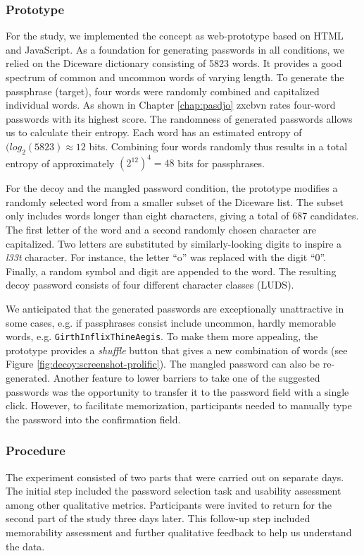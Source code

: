 \subsubsection{Prototype}
For the study, we implemented the concept as web-prototype based on HTML and JavaScript. As a foundation for  generating passwords in all conditions, we relied on the Diceware dictionary consisting of 5823 words. It provides a good spectrum of common and uncommon words of varying length. To generate the passphrase (target), four words were randomly combined and capitalized individual words. As shown in Chapter \ref{chap:pasdjo} zxcbvn rates four-word passwords with its highest score. The randomness of generated passwords allows us to calculate their entropy. Each word has an estimated entropy of $(log_2(5823) \approx 12$ bits. Combining four words randomly thus results in a total entropy of approximately $ (2^{12})^4 = 48$ bits for passphrases.

For the decoy and the mangled password condition, the prototype modifies a randomly selected word from a smaller subset of the Diceware list. The subset only includes words longer than eight characters, giving a total of 687 candidates. The first letter of the word and a second randomly chosen character are capitalized. Two letters are substituted by similarly-looking digits to inspire a \textit{l33t} character. For instance, the letter ``o'' was replaced with the digit ``0''. Finally, a random symbol and digit are appended to the word. The resulting decoy password consists of four different character classes (LUDS). 

We anticipated that the generated passwords are exceptionally unattractive in some cases, e.g. if passphrases consist include uncommon, hardly memorable words, e.g. \texttt{GirthInflixThineAegis}. To make them more appealing, the prototype provides a \textit{shuffle} button that gives a new combination of words (see Figure \ref{fig:decoy:screenshot-prolific}). The mangled password can also be re-generated. Another feature to lower barriers to take one of the suggested passwords was the opportunity to transfer it to the password field with a single click. However, to facilitate memorization, participants needed to manually type the password into the confirmation field. 

\subsubsection{Procedure}
The experiment consisted of two parts that were carried out on separate days. The initial step included the password selection task and usability assessment among other qualitative metrics. Participants were invited to return for the second part of the study three days later. This follow-up step included memorability assessment and further qualitative feedback to help us understand the data.

